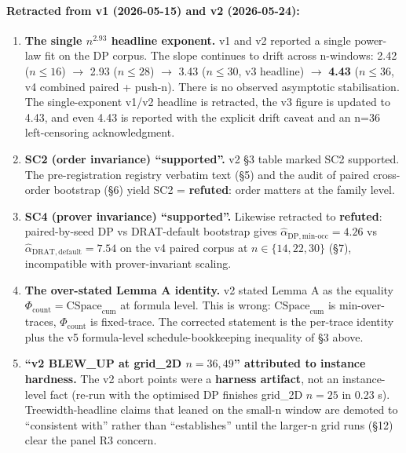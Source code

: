 \documentclass[11pt,a4paper]{article}
\theoremstyle{remark}
\begin{document}
\paragraph{Retracted from v1 (2026-05-15) and v2 (2026-05-24):}
\begin{enumerate}
\item \textbf{The single $n^{2.93}$ headline exponent.} v1 and v2 reported
a single power-law fit on the DP corpus. The slope continues to drift
across n-windows: 2.42 ($n \le 16$) $\to$ 2.93 ($n \le 28$) $\to$ 3.43
($n \le 30$, v3 headline) $\to$ \textbf{4.43} ($n \le 36$, v4 combined
paired + push-n). There is no observed asymptotic stabilisation. The
single-exponent v1/v2 headline is retracted, the v3 figure is updated to
4.43, and even 4.43 is reported with the explicit drift caveat and an
n=36 left-censoring acknowledgment.
\item \textbf{SC2 (order invariance) ``supported''.} v2 \S3 table marked
SC2 supported. The pre-registration registry verbatim text (\S5) and the
audit of paired cross-order bootstrap (\S6) yield SC2 = \textbf{refuted}:
order matters at the family level.
\item \textbf{SC4 (prover invariance) ``supported''.} Likewise retracted
to \textbf{refuted}: paired-by-seed DP vs DRAT-default bootstrap gives
$\widehat\alpha_{\mathrm{DP,min\text{-}occ}} = 4.26$ vs
$\widehat\alpha_{\mathrm{DRAT,default}} = 7.54$ on the v4 paired corpus at
$n \in \{14, 22, 30\}$ (\S7), incompatible with prover-invariant scaling.
\item \textbf{The over-stated Lemma A identity.} v2 stated Lemma A as the
equality $\Phi_{\mathrm{count}} = \mathrm{CSpace}_{\mathrm{cum}}$ at
formula level. This is wrong: $\mathrm{CSpace}_{\mathrm{cum}}$ is
min-over-traces, $\Phi_{\mathrm{count}}$ is fixed-trace. The corrected
statement is the per-trace identity plus the v5 formula-level
schedule-bookkeeping inequality of \S3 above.
\item \textbf{``v2 BLEW\_UP at grid\_2D $n = 36, 49$'' attributed to
instance hardness.} The v2 abort points were a \textbf{harness artifact},
not an instance-level fact (re-run with the optimised DP finishes
grid\_2D $n=25$ in 0.23 s). Treewidth-headline claims that leaned on the
small-n window are demoted to ``consistent with'' rather than
``establishes'' until the larger-n grid runs (\S12) clear the panel R3
concern.
\end{enumerate}
\end{document}
